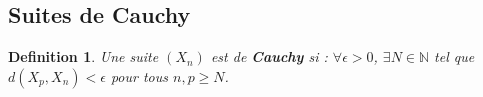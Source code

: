 \documentclass{article}
\newtheorem{definition}{Definition}
\begin{document}
\subsection{Suites de Cauchy}
\begin{definition}
Une suite $(X_n)$ est de \textbf{Cauchy} si :
$\forall \epsilon > 0$, $\exists N \in \mathbb{N}$ tel que $d(X_p, X_n) < \epsilon$ pour tous $n, p \geq N$.
\end{definition}
\end{document}
